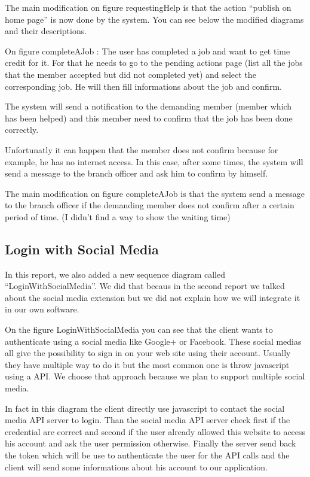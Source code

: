 \documentclass[11pt, a4paper]{article}   	%
\begin{document}
The main modification on figure {requestingHelp} is that the action \enquote{publish on home page} is now done by the system. You can see below the modified 
diagrams and their descriptions.


On figure {completeAJob} : The user has completed a job and want to get time credit for it. For that he needs to go to the pending actions page (list all the jobs that the member accepted but did not completed yet) and select the corresponding job. He will then fill informations about the job and confirm. 

The system will send a notification to the demanding member (member which has been helped) and this member need to confirm that the job has been done correctly.

Unfortunatly it can happen that the member does not confirm because for example, he has no internet access. In this case, after some times, the system will send a message to the branch officer and ask him to confirm by himself.

The main modification on figure {completeAJob} is that the system send a message to the branch officer if the demanding member does not confirm after a certain period of time. (I didn't find a way to show the waiting time)

\subsection{Login with Social Media}

In this report, we also added a new sequence diagram called \enquote{LoginWithSocialMedia}. We did that becaus in the second report we talked about the social media extension but we did not explain how we will integrate it in our own software.


On the figure {LoginWithSocialMedia} you can see that the client wants to authenticate using a social media like Google+ or Facebook. These social medias all give the possibility to sign in on your web site using their account. Usually they have multiple way to do it but the most common one is throw javascript using a API. We choose that approach because we plan to support multiple social media.

In fact in this diagram the client directly use javascript to contact the social media API server to login. Than the social media API server check first if the credential are correct and second if the user already allowed this website to access his account and ask the user permission otherwise. 
Finally the server send back the token which will be use to authenticate the user for the API calls and the client will send some informations about his account to our application.
\end{document}
